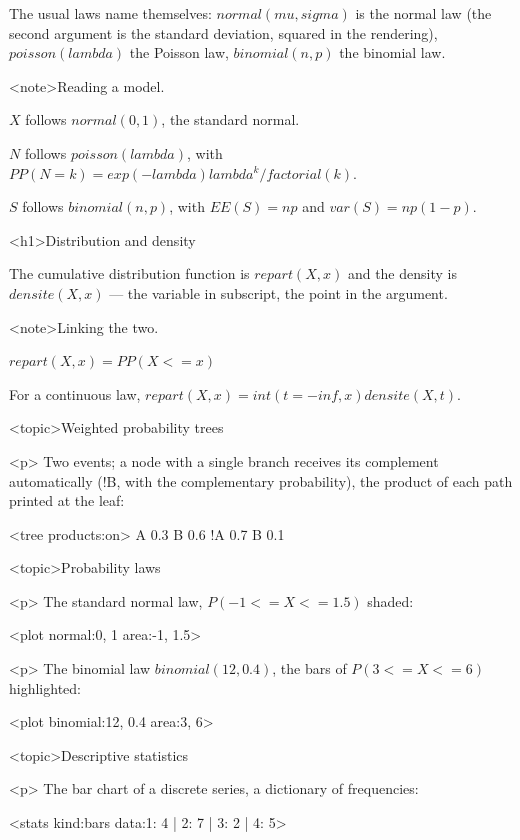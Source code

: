 \documentclass[
  margins=24,
  font=Latin Modern Roman,
  size=12,
  linespread=1.4,
  lang=en
]{scholatex}
\begin{document}
The usual laws name themselves: $normal(mu, sigma)$ is the normal law (the
second argument is the standard deviation, squared in the rendering),
$poisson(lambda)$ the Poisson law, $binomial(n, p)$ the binomial law.

<note>Reading a model.

$X$ follows $normal(0, 1)$, the standard normal.

$N$ follows $poisson(lambda)$, with $PP(N = k) = exp(-lambda) lambda^k / factorial(k)$.

$S$ follows $binomial(n, p)$, with $EE(S) = n p$ and $var(S) = n p (1 - p)$.

<h1>Distribution and density

The cumulative distribution function is $repart(X, x)$ and the density is
$densite(X, x)$ — the variable in subscript, the point in the argument.

<note>Linking the two.

$repart(X, x) = PP(X <= x)$

For a continuous law, $repart(X, x) = int(t=-inf,x) densite(X, t)$.

<topic>Weighted probability trees

<p>{ Two events; a node with a single branch receives its complement
automatically (!B, with the complementary probability), the product of each path printed
at the leaf: }

<tree products:on>{
	A 0.3 {
		B 0.6
	}
	!A 0.7 {
		B 0.1
	}
}

<topic>Probability laws

<p>{ The standard normal law, $P(-1 <= X <= 1.5)$ shaded: }

<plot normal:{0, 1} area:{-1, 1.5}>

<p>{ The binomial law $binomial(12, 0.4)$, the bars of
$P(3 <= X <= 6)$ highlighted: }

<plot binomial:{12, 0.4} area:{3, 6}>

<topic>Descriptive statistics

<p>{ The bar chart of a discrete series, a dictionary of frequencies: }

<stats kind:bars data:{1: 4 | 2: 7 | 3: 2 | 4: 5}>
\end{document}
